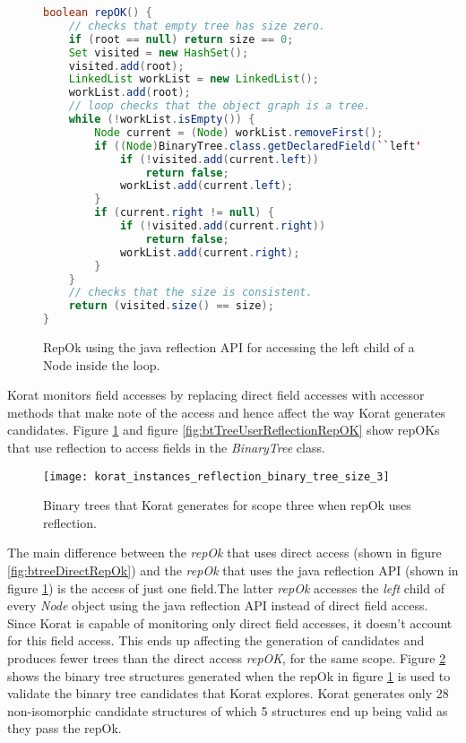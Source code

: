 \begin{figure}
\centering
\begin{lstlisting}[language=Java]
boolean repOK() {
    // checks that empty tree has size zero.
    if (root == null) return size == 0;
    Set visited = new HashSet();
    visited.add(root);
    LinkedList workList = new LinkedList();
    workList.add(root);
    // loop checks that the object graph is a tree.
    while (!workList.isEmpty()) {
        Node current = (Node) workList.removeFirst();
        if ((Node)BinaryTree.class.getDeclaredField(``left'').get(current) != null) {
            if (!visited.add(current.left)) 
                return false;
            workList.add(current.left);
        }
        if (current.right != null) {
            if (!visited.add(current.right))
                return false;
            workList.add(current.right);
        }
    }
    // checks that the size is consistent.
    return (visited.size() == size);
}
\end{lstlisting}
\caption{RepOk using the java reflection API for accessing the left child of a Node inside the loop.}
\label{fig:btTreeReflectionRepOK}
\end{figure}

\para
Korat monitors field accesses by replacing direct field accesses with accessor methods that make note of the access and hence affect the way Korat generates candidates. Figure \ref{fig:btTreeReflectionRepOK} and figure \ref{fig:btTreeUserReflectionRepOK} show repOKs that use reflection to access fields in the \emph{BinaryTree} class.

\begin{figure}
\centering
\texttt{[image: korat\_instances\_reflection\_binary\_tree\_size\_3]}
\caption{ Binary trees that Korat generates for scope three when repOk uses reflection.}
\label{fig:btreeReflectKoratGenScopeThree}
\end{figure}

\para
The main difference between the \emph{repOk} that uses direct access (shown in figure \ref{fig:btreeDirectRepOk}) and the \emph{repOk} that uses the java reflection API (shown in figure \ref{fig:btTreeReflectionRepOK}) is the access of just one field.The latter \emph{repOk} accesses the \emph{left} child of every \emph{Node} object using the java reflection API instead of direct field access. Since Korat is capable of monitoring only direct field accesses, it doesn’t account for this field access. This ends up affecting the generation of candidates and produces fewer trees than the direct access \emph{repOK}, for the same scope. Figure \ref{fig:btreeReflectKoratGenScopeThree} shows the binary tree structures generated when the repOk in figure \ref{fig:btTreeReflectionRepOK} is used to validate the binary tree candidates that Korat explores. Korat generates only 28 non-isomorphic candidate structures of which 5 structures end up being valid as they pass the repOk.


